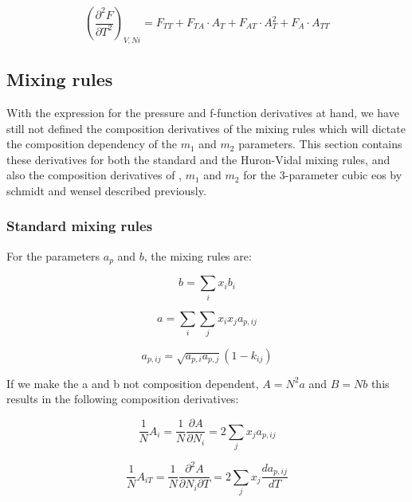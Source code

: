 \documentclass[a4paper, 12pt, english, sintefheadings, sintefcolour]{sintefmemo}
\begin{document}
\noindent\hrulefill


\begin{equation}
\left(\frac{\partial^2 F}{\partial T^2}\right)_{V,Ni}=F_{TT}+F_{TA}\cdot A_T + F_{AT}\cdot A_T^2+F_A\cdot A_{TT}
\end{equation} 

\noindent\hrulefill

\newpage
\subsection{Mixing rules}
With the expression for the pressure and f-function derivatives at hand, we
have still not defined the composition derivatives of the mixing rules which
will dictate the composition dependency of the $m_1$ and $m_2$
parameters. This section contains these derivatives for both the standard and
the Huron-Vidal mixing rules, and also the composition derivatives of , $m_1$
and $m_2$ for the 3-parameter cubic eos by schmidt and wensel described
previously.

\subsubsection{Standard mixing rules}

For the parameters $a_p$ and $b$, the mixing rules are:

\begin{equation}
b=\sum_ix_ib_i
\end{equation}

\begin{equation}
a=\sum_i\sum_jx_ix_ja_{p,ij}
\end{equation}

\begin{equation}
a_{p,ij}=\sqrt{a_{p,i}a_{p,j}}\left(1-k_{ij}\right)
\end{equation}

If we make the a and b not composition dependent, $A=N^2a$ and $B=Nb$ this
results in the following composition derivatives:

\noindent\hrulefill

\begin{equation}
\frac{1}{N}A_i=\frac{1}{N}\frac{\partial A}{\partial N_i}=2\sum_jx_ja_{p,ij}
\end{equation}

\noindent\hrulefill

\begin{equation}
\frac{1}{N}A_{iT}=\frac{1}{N}\frac{\partial^2 A}{\partial N_i \partial T}=2\sum_jx_j\frac{d a_{p,ij}}{dT}
\end{equation}
\end{document}
